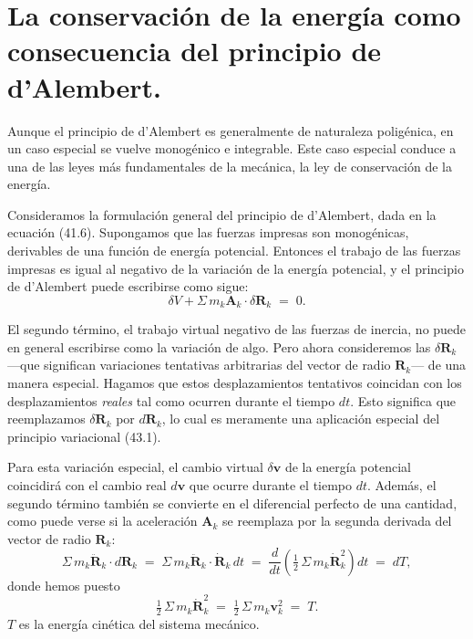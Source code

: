 \documentclass[12pt,a4paper]{book}
\begin{document}
\section{La conservación de la energía como consecuencia del principio de d'Alembert.}

Aunque el principio de d'Alembert es generalmente de naturaleza poligénica, en un caso especial se vuelve monogénico e integrable. Este caso especial conduce a una de las leyes más fundamentales de la mecánica, la ley de conservación de la energía.

Consideramos la formulación general del principio de d'Alembert, dada en la ecuación (41.6). Supongamos que las fuerzas impresas son monogénicas, derivables de una función de energía potencial. Entonces el trabajo de las fuerzas impresas es igual al negativo de la variación de la energía potencial, y el principio de d'Alembert puede escribirse como sigue:
\begin{equation}
\delta V + \Sigma\, m_k \mathbf{A}_k \cdot \delta\mathbf{R}_k \;=\; 0. \tag{43.1}
\end{equation}

El segundo término, el trabajo virtual negativo de las fuerzas de inercia, no puede en general escribirse como la variación de algo. Pero ahora consideremos las $\delta\mathbf{R}_k$ ---que significan variaciones tentativas arbitrarias del vector de radio $\mathbf{R}_k$--- de una manera especial. Hagamos que estos desplazamientos tentativos coincidan con los desplazamientos \textit{reales} tal como ocurren durante el tiempo $dt$. Esto significa que reemplazamos $\delta\mathbf{R}_k$ por $d\mathbf{R}_k$, lo cual es meramente una aplicación especial del principio variacional (43.1).

Para esta variación especial, el cambio virtual $\delta\mathbf{v}$ de la energía potencial coincidirá con el cambio real $d\mathbf{v}$ que ocurre durante el tiempo $dt$. Además, el segundo término también se convierte en el diferencial perfecto de una cantidad, como puede verse si la aceleración $\mathbf{A}_k$ se reemplaza por la segunda derivada del vector de radio $\mathbf{R}_k$:
\begin{equation}
\Sigma\, m_k \ddot{\mathbf{R}}_k \cdot d\mathbf{R}_k \;=\; \Sigma\, m_k \ddot{\mathbf{R}}_k \cdot \dot{\mathbf{R}}_k \, dt \;=\; \frac{d}{dt}\left(\tfrac{1}{2}\,\Sigma\, m_k \dot{\mathbf{R}}_k^2\right) dt \;=\; dT, \tag{43.2}
\end{equation}
donde hemos puesto
\begin{equation}
\tfrac{1}{2}\,\Sigma\, m_k \dot{\mathbf{R}}_k^2 \;=\; \tfrac{1}{2}\,\Sigma\, m_k \mathbf{v}_k^2 \;=\; T. \tag{43.3}
\end{equation}
$T$ es la energía cinética del sistema mecánico.
\end{document}

